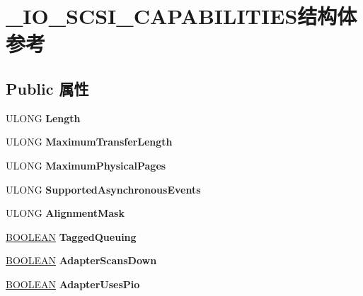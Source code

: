 \hypertarget{struct___i_o___s_c_s_i___c_a_p_a_b_i_l_i_t_i_e_s}{}\section{\+\_\+\+I\+O\+\_\+\+S\+C\+S\+I\+\_\+\+C\+A\+P\+A\+B\+I\+L\+I\+T\+I\+E\+S结构体 参考}
\label{struct___i_o___s_c_s_i___c_a_p_a_b_i_l_i_t_i_e_s}
\subsection*{Public 属性}
\begin{DoxyCompactItemize}
\item 
\mbox{\label{struct___i_o___s_c_s_i___c_a_p_a_b_i_l_i_t_i_e_s_aa00d3fa586299c79461b688fbd089226}} 
U\+L\+O\+NG {\bfseries Length}
\item 
\mbox{\label{struct___i_o___s_c_s_i___c_a_p_a_b_i_l_i_t_i_e_s_a1ae1c0889d0def07ce985fe195b5eb2a}} 
U\+L\+O\+NG {\bfseries Maximum\+Transfer\+Length}
\item 
\mbox{\label{struct___i_o___s_c_s_i___c_a_p_a_b_i_l_i_t_i_e_s_ab5818a5280b0b0be5c394a99ebd69d52}} 
U\+L\+O\+NG {\bfseries Maximum\+Physical\+Pages}
\item 
\mbox{\label{struct___i_o___s_c_s_i___c_a_p_a_b_i_l_i_t_i_e_s_a919df772293e2643f9dc55ad2a8fb403}} 
U\+L\+O\+NG {\bfseries Supported\+Asynchronous\+Events}
\item 
\mbox{\label{struct___i_o___s_c_s_i___c_a_p_a_b_i_l_i_t_i_e_s_abfc8ac2d7ea1256e960aac4ad4668fa2}} 
U\+L\+O\+NG {\bfseries Alignment\+Mask}
\item 
\mbox{\label{struct___i_o___s_c_s_i___c_a_p_a_b_i_l_i_t_i_e_s_ad993beff0fbcad9a8728db7fe6163e74}} 
\hyperlink{_processor_bind_8h_a112e3146cb38b6ee95e64d85842e380a}{B\+O\+O\+L\+E\+AN} {\bfseries Tagged\+Queuing}
\item 
\mbox{\label{struct___i_o___s_c_s_i___c_a_p_a_b_i_l_i_t_i_e_s_a3592106801d6e9ece891a15c0022f85a}} 
\hyperlink{_processor_bind_8h_a112e3146cb38b6ee95e64d85842e380a}{B\+O\+O\+L\+E\+AN} {\bfseries Adapter\+Scans\+Down}
\item 
\mbox{\label{struct___i_o___s_c_s_i___c_a_p_a_b_i_l_i_t_i_e_s_a6a6bf77011d83629c3cc0523446736b0}} 
\hyperlink{_processor_bind_8h_a112e3146cb38b6ee95e64d85842e380a}{B\+O\+O\+L\+E\+AN} {\bfseries Adapter\+Uses\+Pio}
\end{DoxyCompactItemize}


